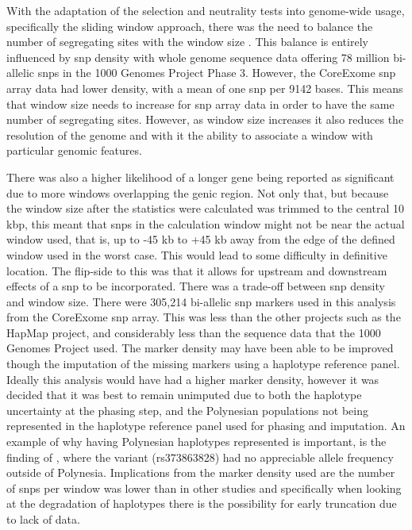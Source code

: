 \documentclass[]{report}
\begin{document}
With the adaptation of the selection and neutrality tests into
genome-wide usage, specifically the sliding window approach, there was
the need to balance the number of segregating sites with the window size
\citep{Pybus2014}. This balance is entirely influenced by \gls{snp}
density with whole genome sequence data offering 78 million bi-allelic
\glspl{snp} in the 1000 Genomes Project Phase 3. However, the CoreExome
\gls{snp} array data had lower density, with a mean of one \gls{snp} per
9142 bases. This means that window size needs to increase for \gls{snp}
array data in order to have the same number of segregating sites.
However, as window size increases it also reduces the resolution of the
genome and with it the ability to associate a window with particular
genomic features.

There was also a higher likelihood of a longer gene being reported as
significant due to more windows overlapping the genic region. Not only
that, but because the window size after the statistics were calculated
was trimmed to the central 10 kbp, this meant that \glspl{snp} in the
calculation window might not be near the actual window used, that is, up
to -45 kb to +45 kb away from the edge of the defined window used in the
worst case. This would lead to some difficulty in definitive location.
The flip-side to this was that it allows for upstream and downstream
effects of a \gls{snp} to be incorporated. There was a trade-off between
\gls{snp} density and window size. There were 305,214 bi-allelic
\gls{snp} markers used in this analysis from the CoreExome \gls{snp}
array. This was less than the other projects such as the HapMap project,
and considerably less than the sequence data that the 1000 Genomes
Project used. The marker density may have been able to be improved
though the imputation of the missing markers using a haplotype reference
panel. Ideally this analysis would have had a higher marker density,
however it was decided that it was best to remain unimputed due to both
the haplotype uncertainty at the phasing step, and the Polynesian
populations not being represented in the haplotype reference panel used
for phasing and imputation. An example of why having Polynesian
haplotypes represented is important, is the finding of
\citet{Minster2016}, where the variant (rs373863828) had no appreciable
allele frequency outside of Polynesia. Implications from the marker
density used are the number of \glspl{snp} per window was lower than in
other studies and specifically when looking at the degradation of
haplotypes there is the possibility for early truncation due to lack of
data.
\end{document}
